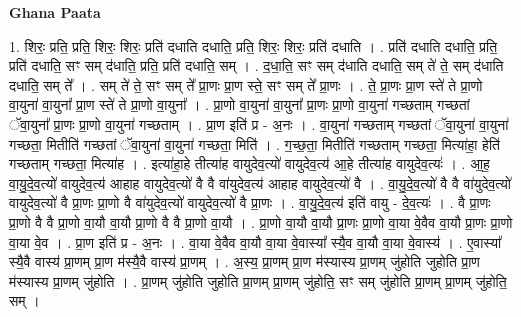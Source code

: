 \documentclass[17pt]{extarticle}
\begin{document}
\textbf{Ghana Paata } \newline

1. शिरः॒ प्रति॒ प्रति॒ शिरः॒ शिरः॒ प्रति॑ दधाति दधाति॒ प्रति॒ शिरः॒ शिरः॒ प्रति॑ दधाति । . प्रति॑ दधाति दधाति॒ प्रति॒ प्रति॑ दधाति॒ सꣳ सम् द॑धाति॒ प्रति॒ प्रति॑ दधाति॒ सम् । . द॒धा॒ति॒ सꣳ सम् द॑धाति दधाति॒ सम् ते॑ ते॒ सम् द॑धाति दधाति॒ सम् ते᳚ । . सम् ते॑ ते॒ सꣳ सम् ते᳚ प्रा॒णः प्रा॒ण स्ते॒ सꣳ सम् ते᳚ प्रा॒णः । . ते॒ प्रा॒णः प्रा॒ण स्ते॑ ते प्रा॒णो वा॒युना॑ वा॒युना᳚ प्रा॒ण स्ते॑ ते प्रा॒णो वा॒युना᳚ । . प्रा॒णो वा॒युना॑ वा॒युना᳚ प्रा॒णः प्रा॒णो वा॒युना॑ गच्छताम् गच्छतां ॅवा॒युना᳚ प्रा॒णः प्रा॒णो वा॒युना॑ गच्छताम् । . प्रा॒ण इति॑ प्र - अ॒नः । . वा॒युना॑ गच्छताम् गच्छतां ॅवा॒युना॑ वा॒युना॑ गच्छता॒ मितीति॑ गच्छतां ॅवा॒युना॑ वा॒युना॑ गच्छता॒ मिति॑ । . ग॒च्छ॒ता॒ मितीति॑ गच्छताम् गच्छता॒ मित्या॑हा॒ हेति॑ गच्छताम् गच्छता॒ मित्या॑ह । . इत्या॑हा॒हे तीत्या॑ह वायुदेव॒त्यो॑ वायुदेव॒त्य॑ आ॒हे तीत्या॑ह वायुदेव॒त्यः॑ । . आ॒ह॒ वा॒यु॒दे॒व॒त्यो॑ वायुदेव॒त्य॑ आहाह वायुदेव॒त्यो॑ वै वै वा॑युदेव॒त्य॑ आहाह वायुदेव॒त्यो॑ वै । . वा॒यु॒दे॒व॒त्यो॑ वै वै वा॑युदेव॒त्यो॑ वायुदेव॒त्यो॑ वै प्रा॒णः प्रा॒णो वै वा॑युदेव॒त्यो॑ वायुदेव॒त्यो॑ वै प्रा॒णः । . वा॒यु॒दे॒व॒त्य॑ इति॑ वायु - दे॒व॒त्यः॑ । . वै प्रा॒णः प्रा॒णो वै वै प्रा॒णो वा॒यौ वा॒यौ प्रा॒णो वै वै प्रा॒णो वा॒यौ । . प्रा॒णो वा॒यौ वा॒यौ प्रा॒णः प्रा॒णो वा॒या वे॒वैव वा॒यौ प्रा॒णः प्रा॒णो वा॒या वे॒व । . प्रा॒ण इति॑ प्र - अ॒नः । . वा॒या वे॒वैव वा॒यौ वा॒या वे॒वास्या᳚ स्यै॒व वा॒यौ वा॒या वे॒वास्य॑ । . ए॒वास्या᳚ स्यै॒वै वास्य॑ प्रा॒णम् प्रा॒ण म॑स्यै॒वै वास्य॑ प्रा॒णम् । . अ॒स्य॒ प्रा॒णम् प्रा॒ण म॑स्यास्य प्रा॒णम् जु॑होति जुहोति प्रा॒ण म॑स्यास्य प्रा॒णम् जु॑होति । . प्रा॒णम् जु॑होति जुहोति प्रा॒णम् प्रा॒णम् जु॑होति॒ सꣳ सम् जु॑होति प्रा॒णम् प्रा॒णम् जु॑होति॒ सम् । \newline
\end{document}
